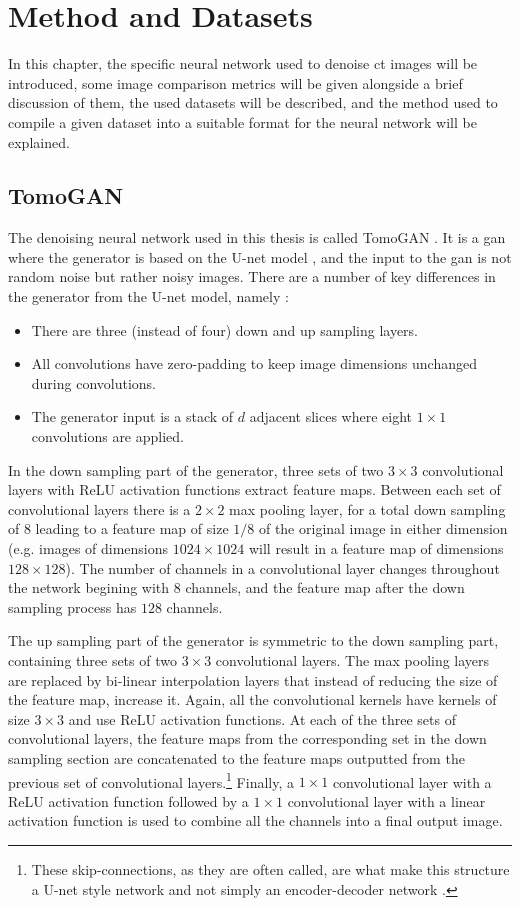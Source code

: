 \chapter{Method and Datasets}
\label{sec:method}
In this chapter, the specific neural network used to denoise \gls{ct} images will be introduced, some image comparison metrics will be given alongside a brief discussion of them, the used datasets will be described, and the method used to compile a given dataset into a suitable format for the neural network will be explained. 


\section{TomoGAN}
\label{sec:method:tomogan}
The denoising neural network used in this thesis is called TomoGAN \cite{liu2020tomogan}. It is a \gls{gan} where the generator is based on the U-net model \cite{unet}, and the input to the \gls{gan} is not random noise but rather noisy images. There are a number of key differences in the generator from the U-net model, namely \cite{liu2020tomogan}:
\begin{itemize}
    \item There are three (instead of four) down and up sampling layers.
    \item All convolutions have zero-padding to keep image dimensions unchanged during convolutions.
    \item The generator input is a stack of $d$ adjacent slices where eight $1\times1$ convolutions are applied. 
\end{itemize}
In the down sampling part of the generator, three sets of two $3\times3$ convolutional layers with ReLU activation functions extract feature maps. Between each set of convolutional layers there is a $2\times2$ max pooling layer, for a total down sampling of $8$ leading to a feature map of size $1/8$ of the original image in either dimension (e.g. images of dimensions $1024\times1024$ will result in a feature map of dimensions $128\times128$). The number of channels in a convolutional layer changes throughout the network begining with $8$ channels, and the feature map after the down sampling process has $128$ channels. 

The up sampling part of the generator is symmetric to the down sampling part, containing three sets of two $3\times3$ convolutional layers. The max pooling layers are replaced by bi-linear interpolation layers that instead of reducing the size of the feature map, increase it. Again, all the convolutional kernels have kernels of size $3\times3$ and use ReLU activation functions. At each of the three sets of convolutional layers, the feature maps from the corresponding set in the down sampling section are concatenated to the feature maps outputted from the previous set of convolutional layers.\footnote{These skip-connections, as they are often called, are what make this structure a U-net style network and not simply an encoder-decoder network \cite{unet}. } Finally, a $1\times1$ convolutional layer with a ReLU activation function followed by a $1\times1$ convolutional layer with a linear activation function is used to combine all the channels into a final output image. 

